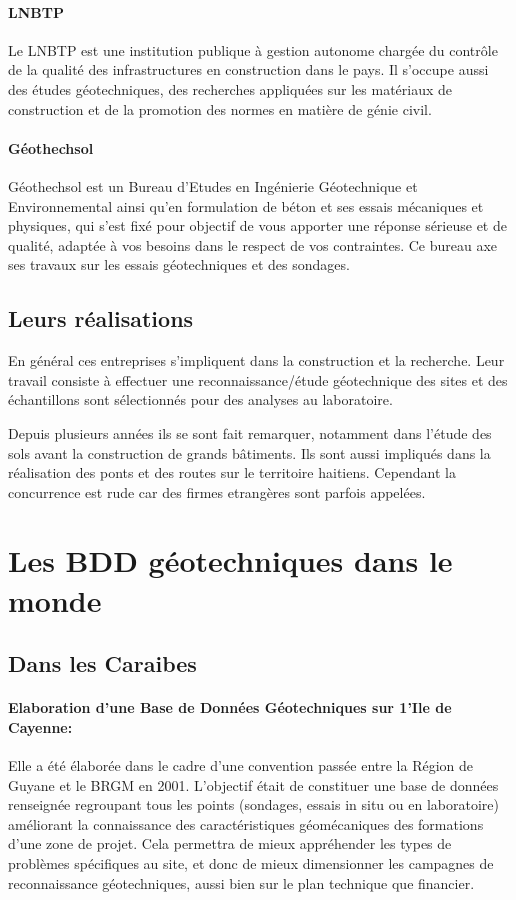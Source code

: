         \paragraph{LNBTP}
        Le LNBTP est une institution publique à gestion autonome chargée du contrôle de la qualité des infrastructures en construction dans le pays. Il s'occupe 
        aussi des études géotechniques, des recherches appliquées sur les matériaux de construction et de la promotion des normes en matière de génie civil.
        \paragraph{Géothechsol}
        Géothechsol est un Bureau d’Etudes en Ingénierie Géotechnique et Environnemental ainsi qu’en formulation de béton et ses essais mécaniques et physiques,
         qui s’est fixé pour objectif de vous apporter une réponse sérieuse et de qualité, adaptée à vos besoins dans le respect de vos contraintes.
         Ce bureau axe ses travaux sur les essais géotechniques et des sondages.

        \subsection{Leurs réalisations}
        En général ces entreprises s'impliquent dans la construction et la recherche. 
        Leur travail consiste à effectuer une reconnaissance/étude géotechnique des sites et des échantillons  sont sélectionnés pour des analyses au
        laboratoire.
        \par
        Depuis plusieurs années ils se sont fait remarquer, notamment dans
         l'étude des sols avant la construction de grands bâtiments. Ils sont aussi impliqués dans la réalisation des ponts et des routes sur le territoire
          haitiens. Cependant la concurrence est rude car des firmes etrangères sont parfois appelées. 
        \section{Les BDD géotechniques dans le monde}
        \subsection{Dans les Caraibes}
        \paragraph{Elaboration d'une Base de Données Géotechniques
        sur 1'Ile de Cayenne: }
        Elle a été élaborée dans le cadre d'une convention passée entre la
        Région de Guyane et le BRGM en 2001.
        \cite{Cayenne}
         L'objectif était de constituer une base de données renseignée regroupant tous les points (sondages, essais
        in situ ou en laboratoire) améliorant la connaissance des caractéristiques géomécaniques des
        formations d'une zone de projet. Cela permettra de mieux appréhender les types de problèmes
        spécifiques au site, et donc de mieux dimensionner les campagnes de reconnaissance
        géotechniques, aussi bien sur le plan technique que financier.
